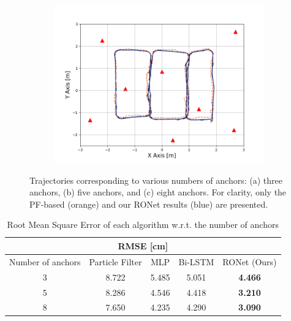 \documentclass[letterpaper, 10 pt, conference]{ieeeconf}
\begin{document}
\begin{figure}[h]
\begin{subfigure}[b]{0.32\textwidth}
		\caption{}
		\label{fig:anchor_5}
	\end{subfigure}
	\begin{subfigure}[b]{0.32\textwidth}
		\includegraphics[width=\textwidth]{image/trajectory_8}
		\caption{}
		\label{fig:anchor_8}
	\end{subfigure}
	\caption{Trajectories corresponding to various numbers of anchors: (a) three anchors, (b) five anchors, and (c) eight anchors. For clarity, only the PF-based (orange) and our RONet results (blue) are presented.}\label{fig:trajectories_358}
\end{figure}

\begin{table}[h]
	\centering
	\caption{Root Mean Square Error of each algorithm w.r.t. the number of anchors}
	\begin{tabular}{ccccc}
		\toprule
		\multicolumn{5}{c}{RMSE {[}cm{]}}   \\ \midrule
		Number of anchors & Particle Filter\cite{gonzalez2009mobile} & MLP\cite{kumar2016localization} & Bi-LSTM\cite{lim2018effective} & RONet (Ours) \\ \cmidrule{2-5} 
		3             & 8.722 & 5.485 & 5.051 & \textbf{4.466} \\
		5             & 8.286 & 4.546 & 4.418 & \textbf{3.210} \\
		8             & 7.650 & 4.235 & 4.290 & \textbf{3.090} \\ \bottomrule
	\end{tabular}
	\label{table:rmse}
\end{table}
\end{document}
